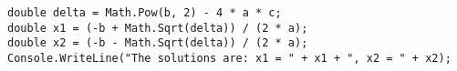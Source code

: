 \documentclass[12pt]{article}
\begin{document}
\begin{enumerate}[itemsep=3em]
\begin{solution}
\begin{english}
\begin{lstlisting}
double delta = Math.Pow(b, 2) - 4 * a * c;
double x1 = (-b + Math.Sqrt(delta)) / (2 * a);
double x2 = (-b - Math.Sqrt(delta)) / (2 * a);
Console.WriteLine("The solutions are: x1 = " + x1 + ", x2 = " + x2);
            \end{lstlisting}
        \end{english}
    \end{solution}
    \fi
    \fi


\end{enumerate}
\end{document}
